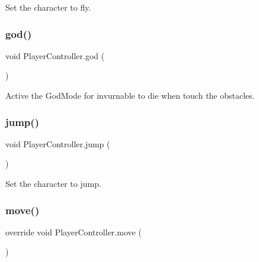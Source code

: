 Set the character to fly. 

\hypertarget{class_player_controller_a45688721d2847fdfcfeeda34b6911b6c}{}\label{class_player_controller_a45688721d2847fdfcfeeda34b6911b6c} 
\subsubsection{\texorpdfstring{god()}{god()}}
{\footnotesize\ttfamily void Player\+Controller.\+god (\begin{DoxyParamCaption}{ }\end{DoxyParamCaption})}



Active the God\+Mode for invurnable to die when touch the obstacles. 

\hypertarget{class_player_controller_a413e8e34033169093b21b38bf6bd0b34}{}\label{class_player_controller_a413e8e34033169093b21b38bf6bd0b34} 
\subsubsection{\texorpdfstring{jump()}{jump()}}
{\footnotesize\ttfamily void Player\+Controller.\+jump (\begin{DoxyParamCaption}{ }\end{DoxyParamCaption})\hspace{0.3cm}{\ttfamily [private]}}



Set the character to jump. 

\hypertarget{class_player_controller_ad29e0ec800244a64e7f2362196cdbf6c}{}\label{class_player_controller_ad29e0ec800244a64e7f2362196cdbf6c} 
\subsubsection{\texorpdfstring{move()}{move()}}
{\footnotesize\ttfamily override void Player\+Controller.\+move (\begin{DoxyParamCaption}{ }\end{DoxyParamCaption})\hspace{0.3cm}{\ttfamily [virtual]}}



